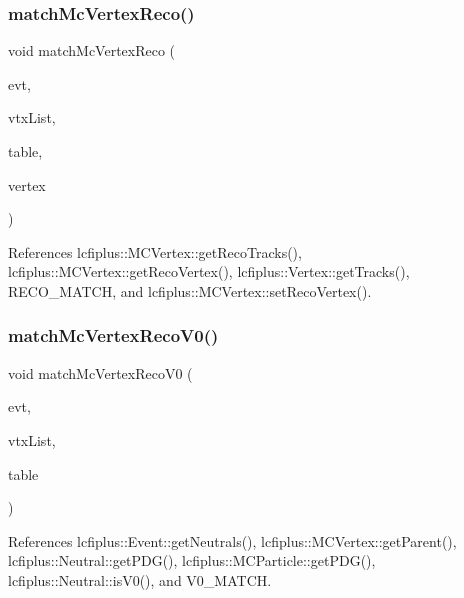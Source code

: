 \subsubsection{match\+Mc\+Vertex\+Reco()}
{\footnotesize\ttfamily void match\+Mc\+Vertex\+Reco (\begin{DoxyParamCaption}\item[{const \textbf{ Event} \&}]{evt,  }\item[{const vector$<$ \textbf{ M\+C\+Vertex} $\ast$$>$ \&}]{vtx\+List,  }\item[{map$<$ \textbf{ M\+C\+Vertex} $\ast$, int $>$ \&}]{table,  }\item[{\textbf{ Vertex} $\ast$}]{vertex }\end{DoxyParamCaption})}



References lcfiplus\+::\+M\+C\+Vertex\+::get\+Reco\+Tracks(), lcfiplus\+::\+M\+C\+Vertex\+::get\+Reco\+Vertex(), lcfiplus\+::\+Vertex\+::get\+Tracks(), R\+E\+C\+O\+\_\+\+M\+A\+T\+CH, and lcfiplus\+::\+M\+C\+Vertex\+::set\+Reco\+Vertex().

\mbox{\label{Driver_8cc_a6b7d4fdfe2aac844a1c09d2a50b88226}} 
\subsubsection{match\+Mc\+Vertex\+Reco\+V0()}
{\footnotesize\ttfamily void match\+Mc\+Vertex\+Reco\+V0 (\begin{DoxyParamCaption}\item[{const \textbf{ Event} \&}]{evt,  }\item[{const vector$<$ \textbf{ M\+C\+Vertex} $\ast$$>$ \&}]{vtx\+List,  }\item[{map$<$ \textbf{ M\+C\+Vertex} $\ast$, int $>$ \&}]{table }\end{DoxyParamCaption})}



References lcfiplus\+::\+Event\+::get\+Neutrals(), lcfiplus\+::\+M\+C\+Vertex\+::get\+Parent(), lcfiplus\+::\+Neutral\+::get\+P\+D\+G(), lcfiplus\+::\+M\+C\+Particle\+::get\+P\+D\+G(), lcfiplus\+::\+Neutral\+::is\+V0(), and V0\+\_\+\+M\+A\+T\+CH.

\mbox{\label{Driver_8cc_a708e3c96c6e0061b7ac97a948a31325a}} 
